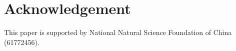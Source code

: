 \documentclass[review]{elsarticle}
\begin{document}
\begin{CJK}{UTF8}{gbsn}
\begin{frontmatter}
\end{frontmatter}

\linenumbers








\section*{Acknowledgement}
This paper is supported by National Natural Science Foundation of China (61772456).






\end{CJK}
\end{document}
